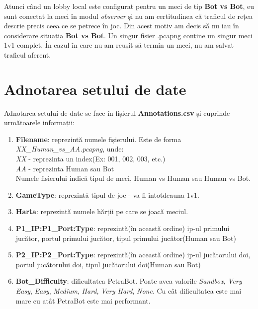 \documentclass[12pt, a4paper, twoside, romanian]{teza-upb}
\begin{document}
            Atunci când un lobby local este configurat pentru un meci de tip \textbf{Bot vs Bot}, eu sunt conectat la meci în modul \textit{observer} și nu am certitudinea că traficul de rețea descrie precis ceea ce se petrece în joc. Din acest motiv am decis să nu iau în considerare situația \textbf{Bot vs Bot}.
            Un singur fișier .pcapng conține un singur meci 1v1 complet. În cazul în care nu am reușit să termin un meci, nu am salvat traficul aferent.

       \section{Adnotarea setului de date}
            Adnotarea setului de date se face în fișierul \textbf{Annotations.csv} și cuprinde următoarele informații:
            \begin{enumerate}
                \item \textbf{Filename}: reprezintă numele fișierului. Este de forma \textit{XX\_Human\_vs\_AA.pcapng}, unde:\\
                \textit{XX} - reprezinta un index(Ex: 001, 002, 003, etc.)\\
                \textit{AA} - reprezinta Human sau Bot\\
                Numele fisierului indică tipul de meci, Human vs Human sau Human vs Bot.

                \item \textbf{GameType}: reprezintă tipul de joc - va fi întotdeauna 1v1.

                \item \textbf{Harta}: reprezintă numele hărții pe care se joacă meciul.

                \item \textbf{P1\_IP:P1\_Port:Type}: reprezintă(în această ordine) ip-ul primului jucător, portul primului jucător, tipul primului jucător(Human sau Bot)

                \item \textbf{P2\_IP:P2\_Port:Type}: reprezintă(în această ordine) ip-ul jucătorului doi, portul jucătorului doi, tipul jucătorului doi(Human sau Bot)

                \item \textbf{Bot\_Difficulty}: dificultatea PetraBot. Poate avea valorile \textit{Sandbox}, \textit{Very Easy}, \textit{Easy}, \textit{Medium}, \textit{Hard}, \textit{Very Hard}, \textit{None}. Cu cât dificultatea este mai mare cu atât PetraBot este mai performant.


\end{enumerate}
\end{document}
